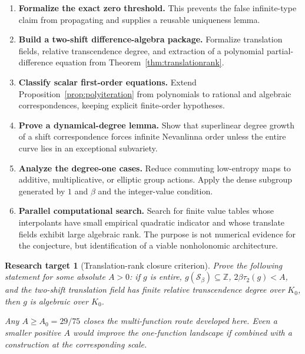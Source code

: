 \documentclass[11pt,oneside]{article}
\newtheorem{target}[theorem]{Research target}
\theoremstyle{definition}
\theoremstyle{remark}
\newcommand{\Z}{\mathbb Z}
\newcommand{\Sbeta}{\mathcal S_\beta}
\begin{document}
\begin{enumerate}
\item \textbf{Formalize the exact zero threshold.}  This prevents the false infinite-type
claim from propagating and supplies a reusable uniqueness lemma.

\item \textbf{Build a two-shift difference-algebra package.}  Formalize translation fields,
relative transcendence degree, and extraction of a polynomial partial-difference equation
from Theorem~\ref{thm:translationrank}.

\item \textbf{Classify scalar first-order equations.}  Extend
Proposition~\ref{prop:polyiteration} from polynomials to rational and algebraic
correspondences, keeping explicit finite-order hypotheses.

\item \textbf{Prove a dynamical-degree lemma.}  Show that superlinear degree growth of a
shift correspondence forces infinite Nevanlinna order unless the entire curve lies in an
exceptional subvariety.

\item \textbf{Analyze the degree-one cases.}  Reduce commuting low-entropy maps to additive,
multiplicative, or elliptic group actions.  Apply the dense subgroup generated by $1$ and
$\beta$ and the integer-value condition.

\item \textbf{Parallel computational search.}  Search for finite value tables whose
interpolants have small empirical quadratic indicator and whose translate fields exhibit
large algebraic rank.  The purpose is not numerical evidence for the conjecture, but
identification of a viable nonholonomic architecture.
\end{enumerate}

\begin{target}[Translation-rank closure criterion]
\label{target:translationclosure}
Prove the following statement for some absolute $A>0$: if $g$ is entire,
$g(\Sbeta)\subseteq\Z$, $2\beta\tau_2(g)<A$, and the two-shift translation field has finite
relative transcendence degree over $K_0$, then $g$ is algebraic over $K_0$.

Any $A\ge A_0=29/75$ closes the multi-function route developed here.  Even a smaller
positive $A$ would improve the one-function landscape if combined with a construction at the
corresponding scale.
\end{target}
\end{document}
